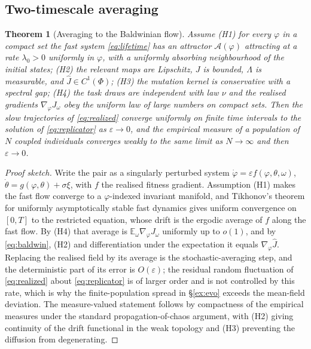 \documentclass[11pt]{article}
\newtheorem{theorem}{Theorem}
\theoremstyle{definition}
\theoremstyle{remark}
\newcommand{\E}{\mathbb{E}}
\begin{document}
\subsection{Two-timescale averaging}
\label{sec:averaging}
\begin{theorem}[Averaging to the Baldwinian flow]
\label{thm:averaging}
Assume
\emph{(H1)} for every $\varphi$ in a compact set the fast system \eqref{eq:lifetime} has an attractor
$\mathcal{A}(\varphi)$ attracting at a rate $\lambda_0>0$ uniformly in $\varphi$, with a uniformly
absorbing neighbourhood of the initial states;
\emph{(H2)} the relevant maps are Lipschitz, $J$ is bounded, $\Lambda$ is measurable, and
$\hat J\in C^1(\Phi)$;
\emph{(H3)} the mutation kernel is conservative with a spectral gap;
\emph{(H4)} the task draws are independent with law $\nu$ and the realised gradients
$\nabla_\varphi J_{\omega}$ obey the uniform law of large numbers on compact sets.
Then the slow trajectories of \eqref{eq:realized} converge uniformly on finite time intervals to the
solution of \eqref{eq:replicator} as $\varepsilon\to0$, and the empirical measure of a population of $N$
coupled individuals converges weakly to the same limit as $N\to\infty$ and then $\varepsilon\to0$.
\end{theorem}
\begin{proof}[Proof sketch]
Write the pair as a singularly perturbed system $\dot\varphi=\varepsilon f(\varphi,\theta,\omega)$,
$\dot\theta=g(\varphi,\theta)+\sigma\xi$, with $f$ the realised fitness gradient. Assumption (H1) makes
the fast flow converge to a $\varphi$-indexed invariant manifold, and Tikhonov's theorem for uniformly
asymptotically stable fast dynamics gives uniform convergence on $[0,T]$ to the restricted equation,
whose drift is the ergodic average of $f$ along the fast flow. By (H4) that average is
$\E_{\omega}\nabla_\varphi J_{\omega}$ uniformly up to $o(1)$, and by \eqref{eq:baldwin}, (H2) and
differentiation under the expectation it equals $\nabla_\varphi\hat J$. Replacing the realised field by
its average is the stochastic-averaging step, and the deterministic part of its error is
$O(\varepsilon)$; the residual random fluctuation of \eqref{eq:realized} about \eqref{eq:replicator} is
of larger order and is not controlled by this rate, which is why the finite-population spread in
\S\ref{ex:evo} exceeds the mean-field deviation. The measure-valued
statement follows by compactness of the empirical measures under the standard propagation-of-chaos
argument, with (H2) giving continuity of the drift functional in the weak topology and (H3) preventing the
diffusion from degenerating.
\end{proof}
\end{document}
